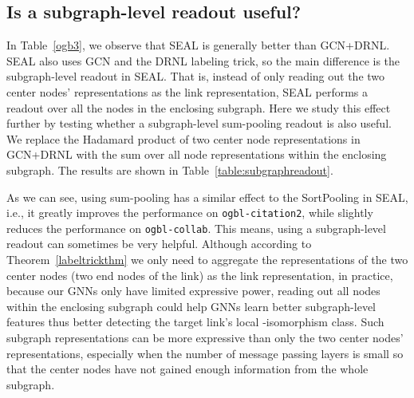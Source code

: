 \documentclass{article}
\begin{document}
\subsection{Is a subgraph-level readout useful?}\label{subgaph_readout}
In Table~\ref{ogb3}, we observe that SEAL is generally better than GCN+DRNL. SEAL also uses GCN and the DRNL labeling trick, so the main difference is the subgraph-level readout in SEAL. That is, instead of only reading out the two center nodes' representations as the link representation, SEAL performs a readout over all the nodes in the enclosing subgraph. Here we study this effect further by testing whether a subgraph-level sum-pooling readout is also useful. We replace the Hadamard product of two center node representations in GCN+DRNL with the sum over all node representations within the enclosing subgraph. The results are shown in Table~\ref{table:subgraphreadout}.

\begin{table}[h]
\caption{Ablation study on subgraph-level readout.}\label{table:subgraphreadout}
\begin{center}
\end{center}
\end{table}

As we can see, using sum-pooling has a similar effect to the SortPooling in SEAL, i.e., it greatly improves the performance on \texttt{ogbl-citation2}, while slightly reduces the performance on \texttt{ogbl-collab}. This means, using a subgraph-level readout can sometimes be very helpful. Although according to Theorem~\ref{labeltrickthm} we only need to aggregate the representations of the two center nodes (two end nodes of the link) as the link representation, in practice, because our GNNs only have limited expressive power, reading out all nodes within the enclosing subgraph could help GNNs learn better subgraph-level features thus better detecting the target link's local -isomorphism class. Such subgraph representations can be more expressive than only the two center nodes' representations, especially when the number of message passing layers is small so that the center nodes have not gained enough information from the whole subgraph.
\end{document}
